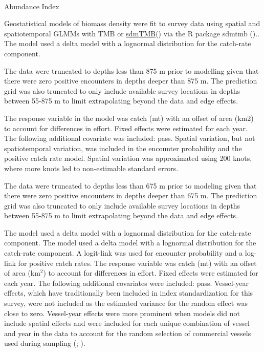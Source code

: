 \documentclass[
]{scrartcl}
\makeatletter
\let\oldparagraph\paragraph
\renewcommand{\paragraph}{
    \@ifstar
      \xxxParagraphStar
      \xxxParagraphNoStar
  }
\newcommand{\xxxParagraphStar}[1]{\oldparagraph*{#1}\mbox{}}
\newcommand{\xxxParagraphNoStar}[1]{\oldparagraph{#1}\mbox{}}
\makeatother
\begin{document}
\paragraph{Abundance Index}\label{abundance-index-3}

Geostatistical models of biomass density were fit to survey data using
spatial and spatiotemporal GLMMs with TMB or
\href{https://pbs-assess.github.io/sdmTMB/}{sdmTMB}() via the R package \gls{sdmtmb}
().. The model
used a delta model with a lognormal distribution for the catch-rate
component.

The data were truncated to depths less than 875 m prior to modelling
given that there were zero positive encounters in depths deeper than 875
m. The prediction grid was also truncated to only include available
survey locations in depths between 55-875 m to limit extrapolating
beyond the data and edge effects.

The response variable in the model was catch (mt) with an offset of area
(km2) to account for differences in effort. Fixed effects were estimated
for each year. The following additional covariate was included: pass.
Spatial variation, but not spatiotemporal variation, was included in the
encounter probability and the positive catch rate model. Spatial
variation was approximated using 200 knots, where more knots led to
non-estimable standard errors.

The data were truncated to depths less than 675 m prior to modeling
given that there were zero positive encounters in depths deeper than 675
m. The prediction grid was also truncated to only include available
survey locations in depths between 55-875 m to limit extrapolating
beyond the data and edge effects.

The model used a delta model with a lognormal distribution for the
catch-rate component. The model used a delta model with a lognormal
distribution for the catch-rate component. A logit-link was used for
encounter probability and a log-link for positive catch rates. The
response variable was catch (mt) with an offset of area (km\(^2\)) to
account for differences in effort. Fixed effects were estimated for each
year. The following additional covariates were included: pass.
Vessel-year effects, which have traditionally been included in index
standardization for this survey, were not included as the estimated
variance for the random effect was close to zero. Vessel-year effects
were more prominent when models did not include spatial effects and were
included for each unique combination of vessel and year in the data to
account for the random selection of commercial vessels used during
sampling (; ).
\end{document}
